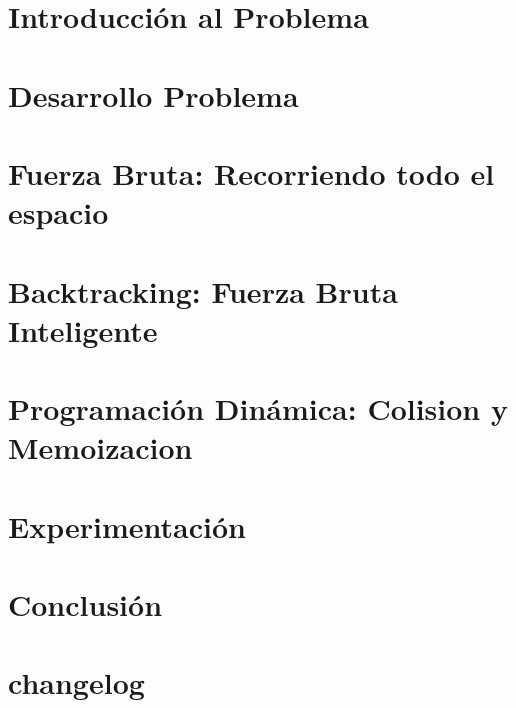 \documentclass[11pt, a4paper]{article}
\begin{document}

\maketitle
\newpage

\tableofcontents
\newpage

\section{Introducción al Problema}


\section{Desarrollo Problema}


\section{Fuerza Bruta: Recorriendo todo el espacio}


\section{Backtracking: Fuerza Bruta Inteligente}



\section{Programación Dinámica: Colision y Memoizacion}



\section{Experimentación}


\section{Conclusión}


\section{changelog}

\end{document}
